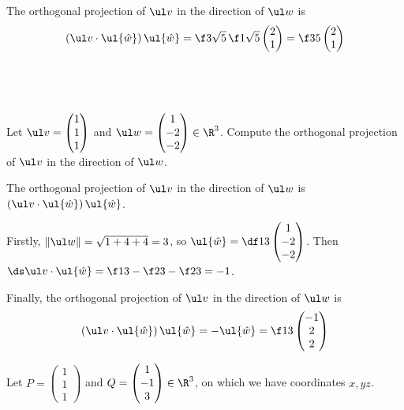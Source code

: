 \documentclass[a4paper]{article}
\begin{document}
The orthogonal projection of $\ul v$ in the direction of $\ul w$ is $$(\ul v \cdot \ul{\hat w})\, \ul{\hat w} = \f3{\sqrt5}\, \f1{\sqrt5} \begin{pmatrix}2\\ 1\end{pmatrix} = \f35 \begin{pmatrix}2\\ 1\end{pmatrix}$$

\subsection{~} %

\begin{questionbody}
Let $\ul v = \begin{pmatrix}1\\ 1\\ 1\end{pmatrix}$ and $\ul w = \begin{pmatrix}1\\ -2\\ -2\end{pmatrix} \in \R^3$. Compute the orthogonal projection of $\ul v$ in the direction of $\ul w$.
\end{questionbody}

The orthogonal projection of $\ul v$ in the direction of $\ul w$ is $(\ul v \cdot \ul{\hat w})\, \ul{\hat w}$.

Firstly, $\|\ul w\| = \sqrt{1+4+4} = 3$, so $\ul{\hat w} = \df13 \begin{pmatrix}1\\ -2\\ -2\end{pmatrix}$. Then $\ds \ul v \cdot \ul{\hat w} = \f13 - \f23 - \f23 = -1$.

Finally, the orthogonal projection of $\ul v$ in the direction of $\ul w$ is $$(\ul v \cdot \ul{\hat w})\, \ul{\hat w} = - \ul{\hat w} = \f13 \begin{pmatrix}-1\\ 2\\ 2\end{pmatrix}$$


\begin{questionbody}
Let $P = \begin{pmatrix}1\\ 1\\ 1\end{pmatrix}$ and $Q = \begin{pmatrix}1\\ -1\\ 3\end{pmatrix} \in \R^3$, on which we have coordinates $x, y z$.
\end{questionbody}
\end{document}
